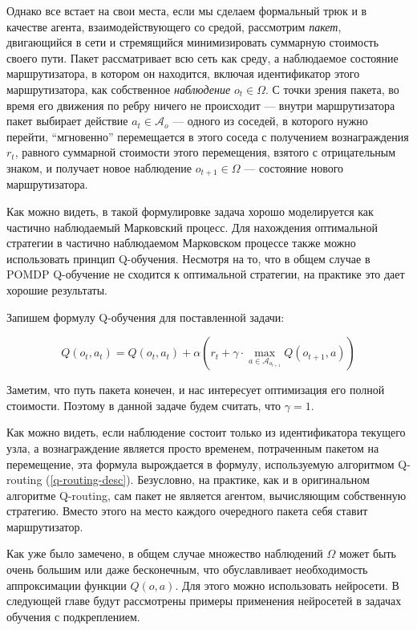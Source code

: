 \documentclass[]{itmo-student-thesis}
\begin{document}
Однако все встает на свои места, если мы сделаем формальный трюк и в качестве
агента, взаимодействующего со средой, рассмотрим \textit{пакет}, двигающийся в
сети и стремящийся минимизировать суммарную стоимость своего пути. Пакет
рассматривает всю сеть как среду, а наблюдаемое состояние маршрутизатора, в
котором он находится, включая идентификатор этого маршрутизатора, как
собственное \textit{наблюдение}  $o_t \in \Omega$. С точки зрения пакета, во время
его движения по ребру ничего не происходит --- внутри маршрутизатора пакет
выбирает действие $a_t \in \mathcal{A}_o$ --- одного из соседей, в которого нужно
перейти, ``мгновенно'' перемещается в этого соседа с получением вознаграждения $r_t$,
равного суммарной стоимости этого перемещения, взятого с отрицательным знаком, и
получает новое наблюдение $o_{t+1} \in \Omega$ --- состояние нового маршрутизатора.

Как можно видеть, в такой формулировке задача хорошо моделируется как частично
наблюдаемый Марковский процесс. Для нахождения оптимальной стратегии в частично
наблюдаемом Марковском процессе также можно использовать принцип Q-обучения.
Несмотря на то, что в общем случае в POMDP Q-обучение не сходится к оптимальной
стратегии, на практике это дает хорошие результаты.

Запишем формулу Q-обучения для поставленной задачи:

\[
Q(o_t, a_t) = Q(o_t, a_t) + \alpha \left( r_t +
\gamma \cdot \max\limits_{a \in \mathcal{A}_{o_{t+1}}} Q(o_{t+1}, a) \right)
\]

Заметим, что путь пакета конечен, и нас интересует оптимизация его полной
стоимости. Поэтому в данной задаче будем считать, что $\gamma = 1$.

Как можно видеть, если наблюдение состоит только из идентификатора текущего
узла, а вознаграждение является просто временем, потраченным пакетом на
перемещение, эта формула вырождается в формулу, используемую алгоритмом
Q-routing (\ref{q-routing-desc}). Безусловно, на практике, как и в оригинальном
алгоритме Q-routing, сам пакет не является агентом, вычисляющим собственную
стратегию. Вместо этого на место каждого очередного пакета себя ставит
маршрутизатор.

Как уже было замечено, в общем случае множество наблюдений $\Omega$ может быть
очень большим или даже бесконечным, что обуславливает необходимость
аппроксимации функции $Q(o, a)$. Для этого можно использовать нейросети. В
следующей главе будут рассмотрены примеры применения нейросетей в задачах
обучения с подкреплением.
\end{document}
